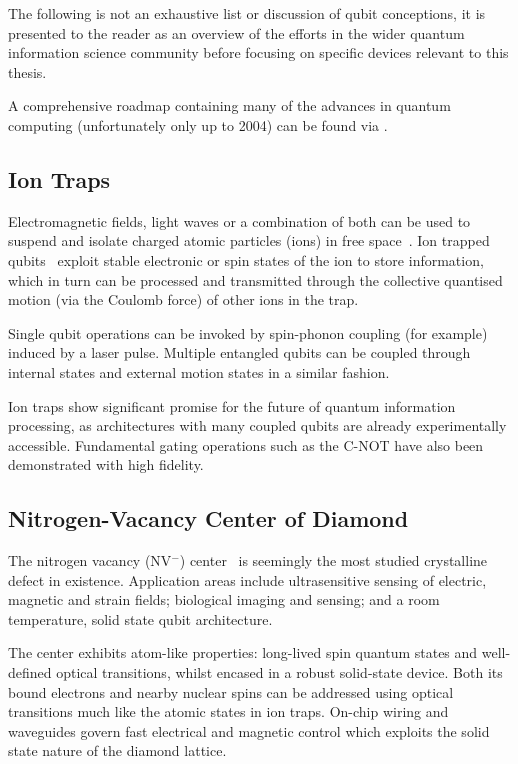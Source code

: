The following is not an exhaustive list or discussion of qubit conceptions, it is presented to the reader as an overview of the efforts in the wider quantum information science community before focusing on specific devices relevant to this thesis.

A comprehensive roadmap containing many of the advances in quantum computing (unfortunately only up to 2004) can be found via .

\subsection{Ion Traps}
Electromagnetic fields, light waves or a combination of both can be used to suspend and isolate charged atomic particles (ions) in free space~\cite{Paul1990}.
Ion trapped qubits~\cite{Cirac1995} exploit stable electronic or spin states of the ion to store information, which in turn can be processed and transmitted through the collective quantised motion (via the Coulomb force) of other ions in the trap.

Single qubit operations can be invoked by spin-phonon coupling (for example) induced by a laser pulse.
Multiple entangled qubits can be coupled through internal states and external motion states in a similar fashion.

Ion traps show significant promise for the future of quantum information processing, as architectures with many coupled qubits are already experimentally accessible.
Fundamental gating operations such as the C-NOT have also been demonstrated with high fidelity.

\subsection{Nitrogen-Vacancy Center of Diamond}

The nitrogen vacancy (NV$^-$) center~\cite{Gruber1997} is seemingly the most studied crystalline defect in existence.
Application areas include ultrasensitive sensing of electric, magnetic and strain fields; biological imaging and sensing; and a room temperature, solid state qubit architecture.

The center exhibits atom-like properties: long-lived spin quantum states and well-defined optical transitions, whilst encased in a robust solid-state device.
Both its bound electrons and nearby nuclear spins can be addressed using optical transitions much like the atomic states in ion traps.
On-chip wiring and waveguides govern fast electrical and magnetic control which exploits the solid state nature of the diamond lattice.

